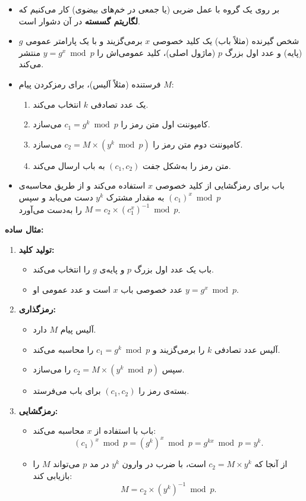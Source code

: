 \documentclass{report}
\begin{document}
\begin{itemize}
    \item بر روی یک گروه با عمل ضربی (یا جمعی در خم‌های بیضوی) کار می‌کنیم که \textbf{لگاریتم گسسته} در آن دشوار است.
    \item شخص گیرنده (مثلاً باب) یک کلید خصوصی $x$ برمی‌گزیند و با یک پارامتر عمومی $g$ (پایه) و عدد اول بزرگ $p$ (ماژول اصلی)، کلید عمومی‌اش را $y = g^x \bmod p$ منتشر می‌کند.
    \item فرستنده (مثلاً آلیس)، برای رمزکردن پیام $M$:
    \begin{enumerate}
        \item یک عدد تصادفی $k$ انتخاب می‌کند.
        \item کامپوننت اول متن رمز را $c_1 = g^k \bmod p$ می‌سازد.
        \item کامپوننت دوم متن رمز را $c_2 = M \times (y^k \bmod p)$ می‌سازد.
        \item متن رمز را به‌شکل جفت $(c_1, c_2)$ به باب ارسال می‌کند.
    \end{enumerate}
    \item باب برای رمزگشایی از کلید خصوصی $x$ استفاده می‌کند و از طریق محاسبه‌ی $(c_1)^x \bmod p$ به مقدار مشترک $y^k$ دست می‌یابد و سپس $M = c_2 \times (c_1^x)^{-1} \bmod p$ را به‌دست می‌آورد.
\end{itemize}

\noindent\textbf{مثال ساده:}
\begin{enumerate}
    \item \textbf{تولید کلید:} 
    \begin{itemize}
        \item باب یک عدد اول بزرگ $p$ و پایه‌ی $g$ را انتخاب می‌کند.
        \item عدد خصوصی باب $x$ است و عدد عمومی او $y = g^x \bmod p$.
    \end{itemize}
    \item \textbf{رمزگذاری:} 
    \begin{itemize}
        \item آلیس پیام $M$ دارد.
        \item آلیس عدد تصادفی $k$ را برمی‌گزیند و $c_1 = g^k \bmod p$ را محاسبه می‌کند.
        \item سپس $c_2 = M \times (y^k \bmod p)$ را می‌سازد.
        \item بسته‌ی رمز را $(c_1,c_2)$ برای باب می‌فرستد.
    \end{itemize}
    \item \textbf{رمزگشایی:} 
    \begin{itemize}
        \item باب با استفاده از $x$ محاسبه می‌کند: 
        \[
        (c_1)^x \bmod p = (g^k)^x \bmod p = g^{kx} \bmod p = y^k.
        \]
        \item از آنجا که $c_2 = M \times y^k$ است، با ضرب در وارون $y^k$ در مد $p$ می‌تواند $M$ را بازیابی کند:
        \[
        M = c_2 \times (y^k)^{-1} \bmod p.
        \]
    \end{itemize}
\end{enumerate}
\end{document}
